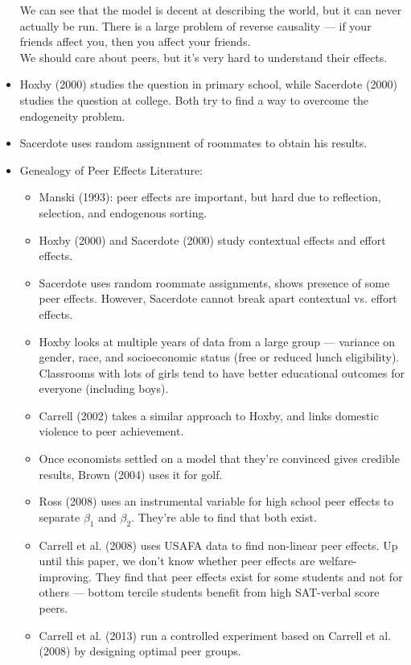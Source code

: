 \documentclass[10pt]{extarticle}
\begin{document}
\begin{itemize}
      We can see that the model is decent at describing the world, but it can never actually be run. There is a large problem of reverse causality --- if your friends affect you, then you affect your friends.\\

      We should care about peers, but it's very hard to understand their effects.
    \item Hoxby (2000) studies the question in primary school, while Sacerdote (2000) studies the question at college. Both try to find a way to overcome the endogeneity problem.
    \item Sacerdote uses random assignment of roommates to obtain his results.
    \item Genealogy of Peer Effects Literature:
      \begin{itemize}
        \item Manski (1993): peer effects are important, but hard due to reflection, selection, and endogenous sorting.
        \item Hoxby (2000) and Sacerdote (2000) study contextual effects and effort effects.
        \item Sacerdote uses random roommate assignments, shows presence of some peer effects. However, Sacerdote cannot break apart contextual vs. effort effects.
        \item Hoxby looks at multiple years of data from a large group --- variance on gender, race, and socioeconomic status (free or reduced lunch eligibility). Classrooms with lots of girls tend to have better educational outcomes for everyone (including boys).
        \item Carrell (2002) takes a similar approach to Hoxby, and links domestic violence to peer achievement.
        \item Once economists settled on a model that they're convinced gives credible results, Brown (2004) uses it for golf.
        \item Ross (2008) uses an instrumental variable for high school peer effects to separate $\beta_1$ and $\beta_2$. They're able to find that both exist.
        \item Carrell et al. (2008) uses USAFA data to find non-linear peer effects. Up until this paper, we don't know whether peer effects are welfare-improving. They find that peer effects exist for some students and not for others --- bottom tercile students benefit from high SAT-verbal score peers.
        \item Carrell et al. (2013) run a controlled experiment based on Carrell et al. (2008) by designing optimal peer groups.

\end{itemize}
\end{itemize}
\end{document}
